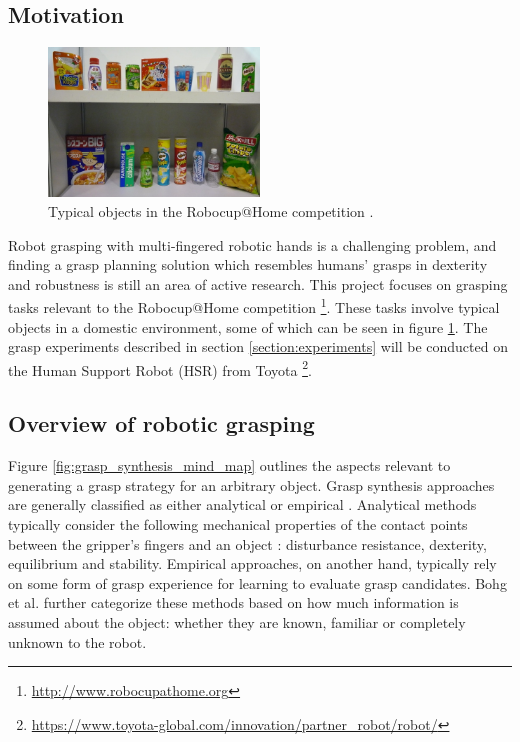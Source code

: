 \documentclass[runningheads]{../llncs}
\begin{document}
\subsection*{Motivation}

\begin{figure}[h!]
    \centering
    \includegraphics[width=0.5\textwidth]{robocup_typical_objects}
    \caption{Typical objects in the Robocup@Home competition \cite{robocupRulebook2018}.}
    \label{fig:robocup_objects}
\end{figure}

Robot grasping with multi-fingered robotic hands is a challenging problem, and finding a grasp planning solution which
resembles humans' grasps in dexterity and robustness is still an area of active research. This project focuses on
grasping tasks relevant to the Robocup@Home competition \footnote{\url{http://www.robocupathome.org}}. These tasks
involve typical objects in a domestic environment, some of which can be seen in figure \ref{fig:robocup_objects}. The
grasp experiments described in section \ref{section:experiments} will be conducted on the Human Support Robot (HSR)
from Toyota \footnote{\url{https://www.toyota-global.com/innovation/partner_robot/robot/}}.

\subsection*{Overview of robotic grasping}

Figure \ref{fig:grasp_synthesis_mind_map} outlines the aspects relevant to generating a grasp strategy for an arbitrary
object. Grasp synthesis approaches are generally classified as either analytical or empirical \cite{Sahbani2012}.
Analytical methods typically consider the following mechanical properties of the contact points between the gripper's
fingers and an object \cite{Roa2015,Sahbani2012,Shimoga1996}: disturbance resistance, dexterity, equilibrium and
stability. Empirical approaches, on another hand, typically rely on some form of grasp experience for learning to
evaluate grasp candidates. Bohg et al. \cite{Bohg2014} further categorize these methods based on how much information
is assumed about the object: whether they are known, familiar or completely unknown to the robot.
\end{document}
